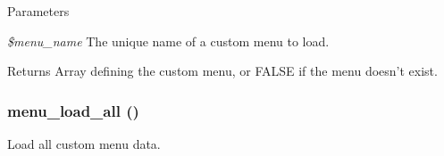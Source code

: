 \begin{DoxyParams}{Parameters}
\item[{\em \$menu\_\-name}]The unique name of a custom menu to load. \end{DoxyParams}
\begin{DoxyReturn}{Returns}
Array defining the custom menu, or FALSE if the menu doesn't exist. 
\end{DoxyReturn}
\hypertarget{menu_8module_a87b63b5f4643ea32aa5a54e2d7cac32d}{
\subsubsection[{menu\_\-load\_\-all}]{\setlength{\rightskip}{0pt plus 5cm}menu\_\-load\_\-all ()}}
\label{menu_8module_a87b63b5f4643ea32aa5a54e2d7cac32d}
Load all custom menu data.

